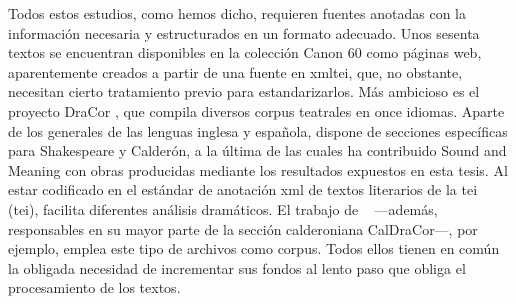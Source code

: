 Todos estos estudios, como hemos dicho, requieren fuentes anotadas con la información necesaria y estructurados en un formato adecuado. Unos sesenta textos se encuentran disponibles en la colección Canon 60 \parencite{tc12} como páginas web, aparentemente creados a partir de una fuente en \ac{xmltei}, que, no obstante, necesitan cierto tratamiento previo para estandarizarlos. Más ambicioso es el proyecto DraCor \parencite{fischer2019}, que compila diversos corpus teatrales en once idiomas. Aparte de los generales de las lenguas inglesa y española, dispone de secciones específicas para Shakespeare y Calderón, a la última de las cuales ha contribuido Sound and Meaning con obras producidas mediante los resultados expuestos en esta tesis. Al estar codificado en el estándar de anotación \ac{xml} de textos literarios de la \acl{tei} (\ac{tei}), facilita diferentes análisis dramáticos. El trabajo de \citeauthor{ehrlicher2020}~\parencite*{ehrlicher2020} —además, responsables en su mayor parte de la sección calderoniana CalDraCor—, por ejemplo, emplea este tipo de archivos como corpus. Todos ellos tienen en común la obligada necesidad de incrementar sus fondos al lento paso que obliga el procesamiento de los textos.

